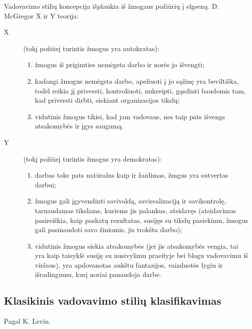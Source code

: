 Vadovavimo stilių koncepcija išplaukia iš žmogaus požiūrių į elgseną.
D. McGregor X ir Y teorija:
\begin{description}
  \item[X] (tokį požiūrį turintis žmogus yra autokratas):
    \begin{enumerate}
      \item žmogus iš prigimties nemėgsta darbo ir norės jo išvengti;
      \item kadangi žmogus nemėgsta darbo, apeliuoti į jo sąžinę yra
        beviltiška, todėl reikia jį priversti, kontroliuoti, nukreipti,
        gąsdinti baudomis tam, kad priversti dirbti, siekiant
        organizacijos tikslų;
      \item vidutinis žmogus tikisi, kad jam vadovaus, nes taip pats
        išvengs atsakomybės ir įgys saugumą.
    \end{enumerate}
  \item[Y] (tokį požiūrį turintis žmogus yra demokratas):
    \begin{enumerate}
      \item darbas toks pats natūralus kaip ir žaidimas, žmgus yra
        sutvertas darbui;
      \item žmogus gali įgyvendinti savivaldą, savirealizaciją ir
        savikontrolę, tarnaudamas tikslams, kuriems jis palankus,
        atsidavęs (atsidavimas pasireiškia, kaip paskatų rezultatas,
        susijęs su tikslų pasiekimu, žmogus gali pasinaudoti savo
        žiniomis, jis trokšta darbo);
      \item vidutinis žmogus siekia atsakomybės (jei jis atsakomybės
        vengia, tai yra kaip taisyklė susiję su nusivylimu praeityje
        bei blogu vadovavimu iš viršaus), yra apdovanotas aukštu
        fantazijos, vaizduotės lygiu ir išradingumu, kurį noriai
        panaudoja darbe.
    \end{enumerate}
\end{description}

\subsection{Klasikinis vadovavimo stilių klasifikavimas}

Pagal K. Levin.

